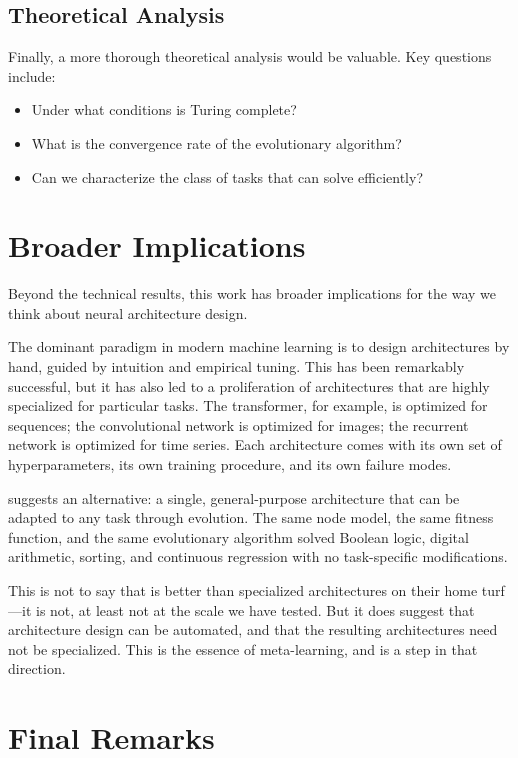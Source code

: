 \subsection{Theoretical Analysis}

Finally, a more thorough theoretical analysis would be valuable. Key
questions include:

\begin{itemize}
  \item Under what conditions is \modnet{} Turing complete?
  \item What is the convergence rate of the evolutionary algorithm?
  \item Can we characterize the class of tasks that \modnet{} can
    solve efficiently?
\end{itemize}

\section{Broader Implications}

Beyond the technical results, this work has broader implications for
the way we think about neural architecture design.

The dominant paradigm in modern machine learning is to design
architectures by hand, guided by intuition and empirical tuning. This
has been remarkably successful, but it has also led to a proliferation
of architectures that are highly specialized for particular tasks. The
transformer, for example, is optimized for sequences; the
convolutional network is optimized for images; the recurrent network
is optimized for time series. Each architecture comes with its own set
of hyperparameters, its own training procedure, and its own failure
modes.

\modnet{} suggests an alternative: a single, general-purpose
architecture that can be adapted to any task through evolution. The
same node model, the same fitness function, and the same evolutionary
algorithm solved Boolean logic, digital arithmetic, sorting, and
continuous regression with no task-specific modifications.

This is not to say that \modnet{} is better than specialized
architectures on their home turf---it is not, at least not at the
scale we have tested. But it does suggest that architecture design
can be automated, and that the resulting architectures need not be
specialized. This is the essence of meta-learning, and \modnet{} is a
step in that direction.

\section{Final Remarks}

